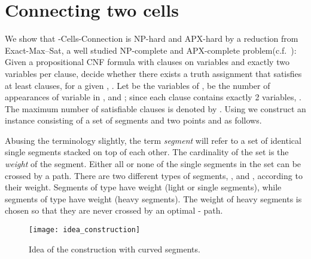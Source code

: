 \documentclass[11pt,a4paper]{article}
\begin{document}
\section{Connecting two cells}
\label{2cells}

We show that {\sc -Cells-Connection} is NP-hard and APX-hard by a reduction from {\sc Exact-Max--Sat}, a well studied NP-complete and APX-complete problem(c.f.~\cite{Hastad01}):
Given a propositional CNF formula  with  clauses on  variables and exactly two variables per clause, decide whether there exists a truth assignment that satisfies at least  clauses, for a given , .
Let  be the variables of ,  be the number of appearances of variable  in , and ; since each clause contains exactly 2 variables, . The maximum number of satisfiable clauses is denoted by .
Using  we construct an instance consisting of a set of segments  and two points  and  as follows.

Abusing the terminology slightly, the term \emph{segment} will refer to a set of identical single segments stacked on top of each other. The cardinality of the set is the \emph{weight} of the segment. Either all or none of the single segments in the set can be crossed by a path. 
There are two different types of segments, , and , according to their weight. Segments of type  have weight  (light or single segments), while segments of type  have weight  (heavy segments). The weight of heavy segments is chosen so that they are never crossed by an optimal - path.

\begin{figure}
\centering
\texttt{[image: idea\_construction]}
\caption{Idea of the construction with curved segments.}
\label{idea}
\end{figure}
\end{document}

